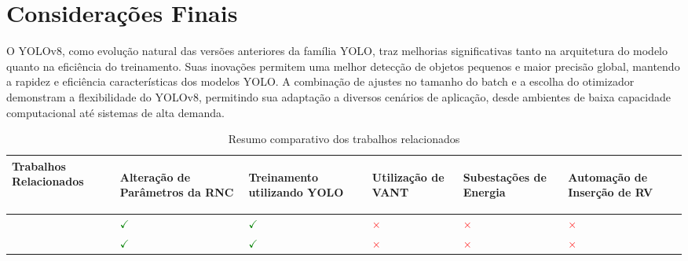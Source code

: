 \section{Considerações Finais} 

O YOLOv8, como evolução natural das versões anteriores da família YOLO, traz melhorias significativas tanto na arquitetura do modelo quanto na eficiência do treinamento. Suas inovações permitem uma melhor detecção de objetos pequenos e maior precisão global, mantendo a rapidez e eficiência características dos modelos YOLO. A combinação de ajustes no tamanho do batch e a escolha do otimizador demonstram a flexibilidade do YOLOv8, permitindo sua adaptação a diversos cenários de aplicação, desde ambientes de baixa capacidade computacional até sistemas de alta demanda.

\begin{table}[!hbt]
    \centering
    \caption{Resumo comparativo dos trabalhos relacionados}
    \begin{tabular}{ >{\centering\arraybackslash}m{5cm} | >{\centering\arraybackslash}m{2cm} | >{\centering\arraybackslash}m{2cm} | >{\centering\arraybackslash}m{2cm} | >{\centering\arraybackslash}m{2cm} | >{\centering\arraybackslash}m{2cm} }
    \hline
    \cellcolor[gray]{0.9} \textbf{Trabalhos Relacionados} & 
    \cellcolor[gray]{0.9} \begin{sideways} \textbf{Alteração de Parâmetros da RNC} \end{sideways} & 
    \cellcolor[gray]{0.9} \begin{sideways} \textbf{Treinamento utilizando YOLO} \end{sideways} & 
    \cellcolor[gray]{0.9} \begin{sideways} \textbf{Utilização de VANT} \end{sideways} & 
    \cellcolor[gray]{0.9} \begin{sideways} \textbf{Subestações de Energia} \end{sideways} &
    \cellcolor[gray]{0.9} \begin{sideways} \textbf{Automação de Inserção de RV} \end{sideways} \\
    \hline 
    \cite{gonzaga2023identificaccao} & \textcolor{green}{\(\checkmark\)} & \textcolor{green}{\(\checkmark\)} & \textcolor{red}{\(\times\)} & \textcolor{red}{\(\times\)} & \textcolor{red}{\(\times\)} \\
    \hline
    \cite{diascomparaccao} & \textcolor{green}{\(\checkmark\)} & \textcolor{green}{\(\checkmark\)} & \textcolor{red}{\(\times\)} & \textcolor{red}{\(\times\)} & \textcolor{red}{\(\times\)} \\

\end{tabular}
\end{table}
